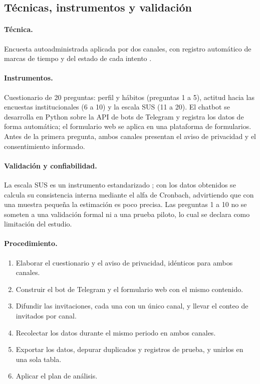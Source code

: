 \documentclass[12pt,letterpaper]{article}
\begin{document}
\subsection{Técnicas, instrumentos y validación}

\paragraph{Técnica.} Encuesta autoadministrada aplicada por dos canales, con registro automático de marcas de tiempo y del estado de cada intento \cite{couper2000}.

\paragraph{Instrumentos.} Cuestionario de 20 preguntas: perfil y hábitos (preguntas 1 a 5), actitud hacia las encuestas institucionales (6 a 10) y la escala SUS (11 a 20). El chatbot se desarrolla en Python sobre la API de bots de Telegram y registra los datos de forma automática; el formulario web se aplica en una plataforma de formularios. Antes de la primera pregunta, ambos canales presentan el aviso de privacidad y el consentimiento informado.

\paragraph{Validación y confiabilidad.} La escala SUS es un instrumento estandarizado \cite{brooke1996}; con los datos obtenidos se calcula su consistencia interna mediante el alfa de Cronbach, advirtiendo que con una muestra pequeña la estimación es poco precisa. Las preguntas 1 a 10 no se someten a una validación formal ni a una prueba piloto, lo cual se declara como limitación del estudio.

\paragraph{Procedimiento.}

\begin{enumerate}
    \item Elaborar el cuestionario y el aviso de privacidad, idénticos para ambos canales.
    \item Construir el bot de Telegram y el formulario web con el mismo contenido.
    \item Difundir las invitaciones, cada una con un único canal, y llevar el conteo de invitados por canal.
    \item Recolectar los datos durante el mismo periodo en ambos canales.
    \item Exportar los datos, depurar duplicados y registros de prueba, y unirlos en una sola tabla.
    \item Aplicar el plan de análisis.
\end{enumerate}
\end{document}
